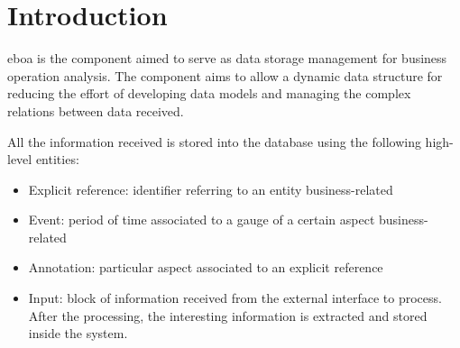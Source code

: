\chapter{Introduction}\label{c:intro}

\acrshort{eboa} is the component aimed to serve as data storage management for business operation analysis. The component aims to allow a dynamic data structure for reducing the effort of developing data models and managing the complex relations between data received.

All the information received is stored into the database using the following high-level entities:

\begin{itemize}

\item Explicit reference: identifier referring to an entity business-related
\item Event: period of time associated to a gauge of a certain aspect business-related
\item Annotation: particular aspect associated to an explicit reference
\item Input: block of information received from the external interface to process. After the processing, the interesting information is extracted and stored inside the system.

\end{itemize}

